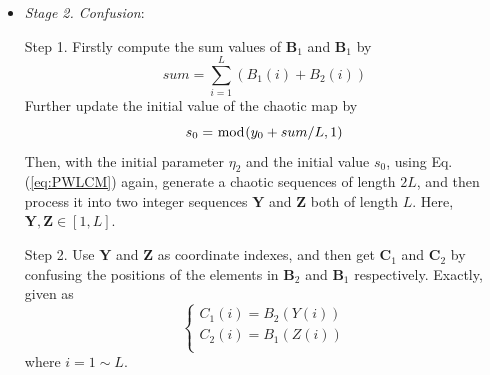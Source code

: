 \documentclass[final,3p,times,twocolumn]{elsarticle}
\begin{document}
\begin{itemize}
	Step 2. Get $\bm{B}_{1}$ by performing the bitwise XOR operations between $\bm{A}_{11}$, $\bm{A}_{2}$ and $\bm{b}_{1}$, given as
	\begin{equation}
	\left\{ \begin{array}{l}
	B_1(1) = A_{11}(1) \oplus A_{11}(L) \oplus A_{2}(1) \oplus b_{1}(1)\\
	B_1(i) = A_{11}(i) \oplus A_{11}(i-1) \oplus A_{2}(i) \oplus b_{1}(i)
	\end{array} \right.
	\label{eq:B1_diffusion}
	\end{equation}
	where $i=2 \sim L$.
	
	Step 3. Like Step 1, firstly compute the sum values $sum_2$ of $\bm{B}_1$ as
	\begin{equation}
	sum_2 = \sum\limits_{i= 1}^{L} B_1(i)
	\label{eq:sum2}
	\end{equation}
	Then , get $\bm{A}_{22}$ cyclic right shifting $\bm{A}_2$ with $sum_2$ bits.
	
	Step 4. Similar to Step 2, obtain $\bm{B}_{2}$ from $\bm{A}_{22}$, $\bm{B}_{1}$ and $\bm{b}_{2}$, modeled by
	\begin{equation}
	\left\{ \begin{array}{l}
	B_2(1) = A_{22}(1) \oplus A_{22}(L) \oplus B_{1}(1) \oplus b_{2}(1)\\
	B_2(i) = A_{22}(i) \oplus A_{22}(i-1) \oplus B_{1}(i) \oplus b_{2}(i)
	\end{array} \right.
	\label{eq:B2_diffusion}
	\end{equation}
	where $i=2 \sim L$.
%	
	\item \emph{Stage 2. Confusion}:
	
	Step 1. Firstly compute the sum values of $\bm{B}_1$ and $\bm{B}_1$ by
	\begin{equation}
	sum = \sum\limits_{i= 1}^{L} (B_1(i)+B_2(i))
	\label{eq:sum3}
	\end{equation}
	Further update the initial value of the chaotic map by
	\begin{equation}
	s_0 = \bmod(y_0+sum/L,1)\\
	\label{eq:update_y0}
	\end{equation}
	Then, with the initial parameter $\eta_2$ and the initial value $s_0$,  using Eq. (\ref{eq:PWLCM}) again, generate a chaotic sequences of length $2L$, and then process it into two integer sequences $\bm{Y}$ and $\bm{Z}$ both of length $L$. Here, $\bm{Y},\bm{Z} \in [1,L]$.
	
	Step 2. Use $\bm{Y}$ and $\bm{Z}$ as coordinate indexes, and then get $\bm{C}_1$ and $\bm{C}_2$ by confusing the positions of the elements in $\bm{B}_2$ and $\bm{B}_1$ respectively. Exactly, given as
	\begin{equation}
	\left\{ \begin{array}{l}
	C_1(i) = B_2(Y(i))\\
	C_2(i) = B_1(Z(i))\\
	\end{array} \right.
	\label{eq:confusion}
	\end{equation}
	where $i=1 \sim L$. 
	

\end{itemize}
\end{document}
